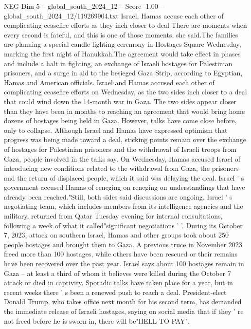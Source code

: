 \begin{textsample}{NEG Dim 5 – global\_south\_2024\_12 – Score -1.00 – global\_south\_2024\_12/119269904.txt}  \label{ex:f5_neg_402}
Israel, Hamas accuse each other of complicating ceasefire efforts as they inch closer to deal There are moments when every second is fateful, and this is one of those moments, she said.The families are planning a special candle lighting ceremony in Hostages Square Wednesday, marking the first night of Hanukkah.The agreement would take effect in phases and include a halt in fighting, an exchange of Israeli hostages for Palestinian prisoners, and a surge in aid to the besieged Gaza Strip, according to Egyptian, Hamas and American officials.
Israel and Hamas accused each other of complicating ceasefire efforts on Wednesday, as the two sides inch closer to a deal that could wind down the 14-month war in Gaza.
The two sides appear closer than they have been in months to reaching an agreement that would bring home dozens of hostages being held in Gaza.
However, talks have come close before, only to collapse.
Although Israel and Hamas have expressed optimism that progress was being made toward a deal, sticking points remain over the exchange of hostages for Palestinian prisoners and the withdrawal of Israeli troops from Gaza, people involved in the talks say.
On Wednesday, Hamas accused Israel of introducing new conditions related to the withdrawal from Gaza, the prisoners and the return of displaced people, which it said was delaying the deal.
Israel ' s government accused Hamas of reneging on reneging on understandings that have already been reached."Still, both sides said discussions are ongoing.
Israel ' s negotiating team, which includes members from its intelligence agencies and the military, returned from Qatar Tuesday evening for internal consultations, following a week of what it called"significant negotiations ' '.
During its October 7, 2023, attack on southern Israel, Hamas and other groups took about 250 people hostages and brought them to Gaza.
A previous truce in November 2023 freed more than 100 hostages, while others have been rescued or their remains have been recovered over the past year.
Israel says about 100 hostages remain in Gaza -- at least a third of whom it believes were killed during the October 7 attack or died in captivity.
Sporadic talks have taken place for a year, but in recent weeks there ' s been a renewed push to reach a deal.
President-elect Donald Trump, who takes office next month for his second term, has demanded the immediate release of Israeli hostages, saying on social media that if they ' re not freed before he is sworn in, there will be"HELL TO PAY".

\end{textsample}
